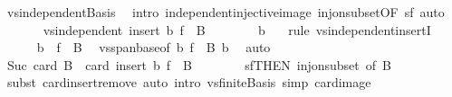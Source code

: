 \begin{isabellebody}
\ vs{}{\isachardot}{\kern0pt}independent{\isacharunderscore}{\kern0pt}Basis\ \isamarkupfalse%
\ {\isacharparenleft}{\kern0pt}intro\ independent{\isacharunderscore}{\kern0pt}injective{\isacharunderscore}{\kern0pt}image\ inj{\isacharunderscore}{\kern0pt}on{\isacharunderscore}{\kern0pt}subset{\isacharbrackleft}{\kern0pt}OF\ sf{\isacharbrackright}{\kern0pt}{\isacharparenright}{\kern0pt}\ auto\isanewline
\ \ \ \ \isamarkupfalse%
\ {\isacharasterisk}{\kern0pt}{\isacharasterisk}{\kern0pt}{\isacharcolon}{\kern0pt}\ {\isachardoublequoteopen}vs{}{\isachardot}{\kern0pt}independent\ {\isacharparenleft}{\kern0pt}insert\ b\ {\isacharparenleft}{\kern0pt}f\ {\isacharbackquote}{\kern0pt}\ B{}{\isacharparenright}{\kern0pt}{\isacharparenright}{\kern0pt}{\isachardoublequoteclose}\isanewline
\ \ \ \ \ \ \isamarkupfalse%
\ b\ {\isacharasterisk}{\kern0pt}\ \isamarkupfalse%
\ {\isacharparenleft}{\kern0pt}rule\ vs{}{\isachardot}{\kern0pt}independent{\isacharunderscore}{\kern0pt}insertI{\isacharparenright}{\kern0pt}\isanewline
\isanewline
\ \ \ \ \isamarkupfalse%
\ {\isachardoublequoteopen}b\ {\isasymnotin}\ f\ {\isacharbackquote}{\kern0pt}\ B{}{\isachardoublequoteclose}\ \isamarkupfalse%
\ vs{}{\isachardot}{\kern0pt}span{\isacharunderscore}{\kern0pt}base{\isacharbrackleft}{\kern0pt}of\ b\ {\isachardoublequoteopen}f\ {\isacharbackquote}{\kern0pt}\ B{}{\isachardoublequoteclose}{\isacharbrackright}{\kern0pt}\ b\ \isamarkupfalse%
\ auto\isanewline
\ \ \ \ \isamarkupfalse%
\ \isamarkupfalse%
\ {\isachardoublequoteopen}Suc\ {\isacharparenleft}{\kern0pt}card\ B{}{\isacharparenright}{\kern0pt}\ {\isacharequal}{\kern0pt}\ card\ {\isacharparenleft}{\kern0pt}insert\ b\ {\isacharparenleft}{\kern0pt}f\ {\isacharbackquote}{\kern0pt}\ B{}{\isacharparenright}{\kern0pt}{\isacharparenright}{\kern0pt}{\isachardoublequoteclose}\isanewline
\ \ \ \ \ \ \isamarkupfalse%
\ sf{\isacharbrackleft}{\kern0pt}THEN\ inj{\isacharunderscore}{\kern0pt}on{\isacharunderscore}{\kern0pt}subset{\isacharcomma}{\kern0pt}\ of\ B{}{\isacharbrackright}{\kern0pt}\ \isamarkupfalse%
\ {\isacharparenleft}{\kern0pt}subst\ card{\isachardot}{\kern0pt}insert{\isacharunderscore}{\kern0pt}remove{\isacharparenright}{\kern0pt}\ {\isacharparenleft}{\kern0pt}auto\ intro{\isacharcolon}{\kern0pt}\ vs{}{\isachardot}{\kern0pt}finite{\isacharunderscore}{\kern0pt}Basis\ simp{\isacharcolon}{\kern0pt}\ card{\isacharunderscore}{\kern0pt}image{\isacharparenright}{\kern0pt}\isanewline

\end{isabellebody}
